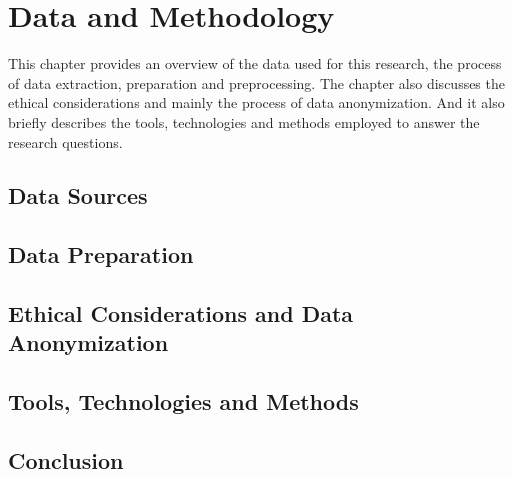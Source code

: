 \chapter{Data and Methodology}
\label{ch:data-methodology}
This chapter provides an overview of the data used for this research, the process of data extraction, preparation and preprocessing.
The chapter also discusses the ethical considerations and mainly the process of data anonymization.
And it also briefly describes the tools, technologies and methods employed to answer the research questions.


\section{Data Sources}
\label{sec:data-methodology-sources}


\section{Data Preparation}
\label{sec:data-methodology-preparation}


\section{Ethical Considerations and Data Anonymization}
\label{sec:data-methodologyethical-considerations-anonymization}


\section{Tools, Technologies and Methods}
\label{sec:data-methodology-tools-technologies-methods}


\section{Conclusion}
\label{sec:data-methodology-conclusion}

